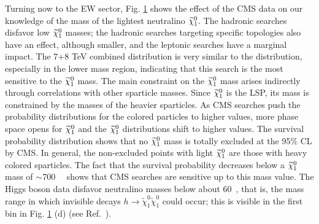 Turning now to the EW sector, 
Fig. \ref{fig:mz1} shows the effect of the CMS data on our knowledge of the
mass of the lightest neutralino $\widetilde{\chi}^0_1$.  The hadronic 
searches disfavor low $\widetilde{\chi}^0_1$ masses; the hadronic
searches targeting specific topologies also have an effect, although
smaller, and the leptonic searches have a marginal impact.  The
7$+$8 TeV combined distribution is very similar to the \MTtwo{}
distribution, especially in the lower mass region, indicating that this search is the most sensitive to the
$\widetilde{\chi}^0_1$ mass.  The main constraint 
on the $\widetilde{\chi}^0_1$ mass arises indirectly through correlations with other sparticle masses.  Since $\widetilde{\chi}^0_1$ is
the LSP, its mass is constrained by the masses of
the heavier sparticles.  As CMS searches push the probability
distributions for the colored particles to higher values, more phase
space opens for $\widetilde{\chi}^0_1$ and the $\widetilde{\chi}^0_1$ distributions shift to higher
values.  The survival probability distribution shows that no $\widetilde{\chi}^0_1$
mass is totally excluded at the 95\% CL by CMS.  In general, the non-excluded points with light $\widetilde{\chi}^0_1$ are those with heavy colored sparticles.  The fact that the survival probability decreases below a $\widetilde{\chi}^0_1$ mass of $\sim$700~\GeV~ shows that CMS searches are sensitive up to this mass value.
The Higgs boson data disfavor neutralino masses below about 60~\GeV, that is,
the mass range in which invisible decays
$h\to\tilde\chi^0_1\tilde\chi^0_1$ could occur; this is visible in the
first bin in Fig. \ref{fig:mz1} (d) (see Ref.~\cite{Bernon:2014vta}).

\begin{figure}[t]
    \vspace{1mm}
    \caption{}
    \label{fig:mz1}
\end{figure}

